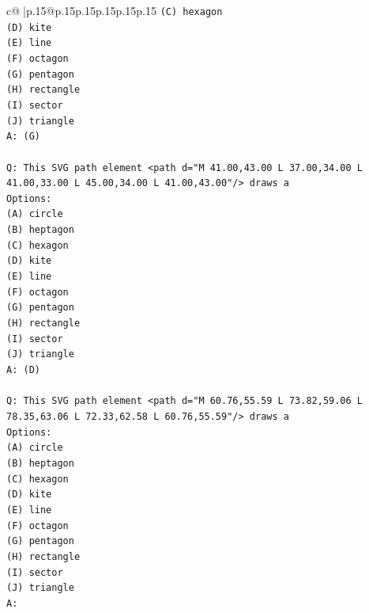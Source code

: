 \documentclass{article}
\begin{document}
{\begin{supertabular}{c@{$\;$}|p{.15\linewidth}@{}p{.15\linewidth}p{.15\linewidth}p{.15\linewidth}p{.15\linewidth}p{.15\linewidth}}
{{{\texttt{(C) hexagon} \\
\texttt{(D) kite} \\
\texttt{(E) line} \\
\texttt{(F) octagon} \\
\texttt{(G) pentagon} \\
\texttt{(H) rectangle} \\
\texttt{(I) sector} \\
\texttt{(J) triangle} \\
\texttt{A: (G)} \\
\\ 
\texttt{Q: This SVG path element <path d="M 41.00,43.00 L 37.00,34.00 L 41.00,33.00 L 45.00,34.00 L 41.00,43.00"/> draws a} \\
\texttt{Options:} \\
\texttt{(A) circle} \\
\texttt{(B) heptagon} \\
\texttt{(C) hexagon} \\
\texttt{(D) kite} \\
\texttt{(E) line} \\
\texttt{(F) octagon} \\
\texttt{(G) pentagon} \\
\texttt{(H) rectangle} \\
\texttt{(I) sector} \\
\texttt{(J) triangle} \\
\texttt{A: (D)} \\
\\ 
\texttt{Q: This SVG path element <path d="M 60.76,55.59 L 73.82,59.06 L 78.35,63.06 L 72.33,62.58 L 60.76,55.59"/> draws a} \\
\texttt{Options:} \\
\texttt{(A) circle} \\
\texttt{(B) heptagon} \\
\texttt{(C) hexagon} \\
\texttt{(D) kite} \\
\texttt{(E) line} \\
\texttt{(F) octagon} \\
\texttt{(G) pentagon} \\
\texttt{(H) rectangle} \\
\texttt{(I) sector} \\
\texttt{(J) triangle} \\
\texttt{A:} \\
            }
        }
    }
     \\ \\


\end{supertabular}}
\end{document}
